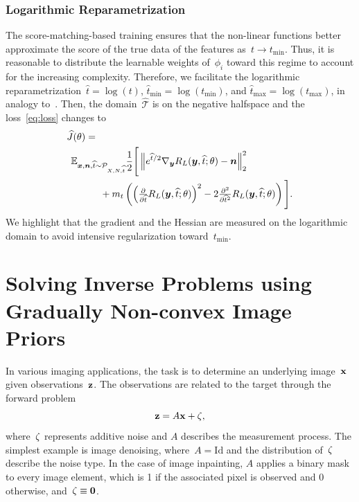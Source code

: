 \documentclass{article}
\newcommand{\T}{\mathcal{T}}
\newcommand{\id}{\mathrm{Id}}
\newcommand{\norm}[1]{\left\Vert#1\right\Vert}
\renewcommand{\vec}[1]{\mathbf{#1}}
\newcommand{\tmin}{t_\mathrm{min}}
\newcommand{\tmax}{t_\mathrm{max}}
\def\hatt{{\widehat{t}}}
\newcommand{\tminh}{\hatt_\mathrm{min}}
\newcommand{\tmaxh}{\hatt_\mathrm{max}}
\newcommand{\dist}[1]{\mathcal{P}_{#1}}
\theoremstyle{plain}
\theoremstyle{definition}
\theoremstyle{remark}
\begin{document}
\subsubsection{Logarithmic Reparametrization}
The score-matching-based training ensures that the non-linear functions better approximate the score of the true data of the features as~$t\to\tmin$.
Thus, it is reasonable to distribute the learnable weights of~$\phi_i$ toward this regime to account for the increasing complexity.
Therefore, we facilitate the logarithmic reparametrization~$\hatt=\log(t)$, $\tminh=\log(\tmin)$, and $\tmaxh=\log(\tmax)$, in analogy to~\citet{KaMi22}.
Then, the domain~$\widehat{\T}$ is on the negative halfspace and the loss~\eqref{eq:loss} changes to
\begin{align} \label{eq:losslog}
&\widehat{J}(\theta)=\\
&\hspace{1ex}\E_{\vx,\vn,\hatt\sim\dist{X,N,\hatt}}\frac12\Bigg[\norm{e^{\hatt/2}\nabla_\vy R_L(\vy,\hatt;\theta) -\vn}_2^2 \notag\\
&\hspace{8ex}+ m_t\left(\left(\tfrac{\partial}{\partial\hatt}R_L(\vy,\hatt;\theta)\right)^2 -2\tfrac{\partial^2}{\partial \hatt^2}R_L(\vy,\hatt;\theta)\right)\Bigg]. \notag
\end{align}
We highlight that the gradient and the Hessian are measured on the logarithmic domain to avoid intensive regularization toward~$\tmin$.


\section{Solving Inverse Problems using Gradually Non-convex Image Priors}
In various imaging applications, the task is to determine an underlying image~${\mathbf{x}}$ given observations~${\mathbf{z}}$.
The observations are related to the target through the forward problem
\[
{\mathbf{z}} = A {\mathbf{x}} + {\mathbf{\zeta}},
\]
where~${\mathbf{\zeta}}$ represents additive noise and $A$ describes the measurement process.
The simplest example is image denoising, where~$A=\id$ and the distribution of~${\mathbf{\zeta}}$ describe the noise type.
In the case of image inpainting, $A$ applies a binary mask to every image element, which is 1 if the associated pixel is observed and 0 otherwise, and~$\rvzeta\equiv\vec{0}$.
\end{document}
